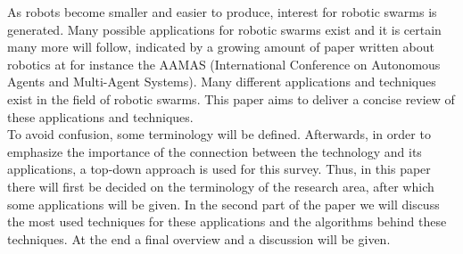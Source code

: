 As robots become smaller and easier to produce, interest for robotic swarms is generated. Many possible applications for robotic swarms exist and it is certain many more will follow, indicated by a growing amount of paper written about robotics at for instance the AAMAS (International Conference on Autonomous Agents and Multi-Agent Systems). \cite{Amigoni2014} Many different applications and techniques exist in the field of robotic swarms. This paper aims to deliver a concise review of these applications and techniques. \\

To avoid confusion, some terminology will be defined. Afterwards, in order to emphasize the importance of the connection between the technology and its applications, a top-down approach is used for this survey. Thus, in this paper there will first be decided on the terminology of the research area, after which some applications will be given. In the second part of the paper we will discuss the most used techniques for these applications and the algorithms behind these techniques. At the end a final overview and a discussion will be given.\\